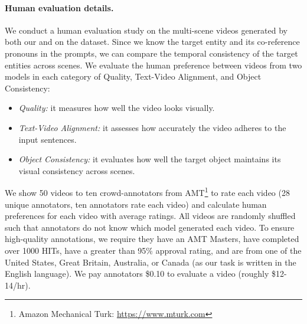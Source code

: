 \paragraph{Human evaluation details.}
We conduct a human evaluation study on the multi-scene videos generated by both our \method{} and \modelscope{} on the \corefdata{} dataset.
Since we know the target entity and its co-reference pronouns in the \corefdata{} prompts,
we can compare the temporal consistency of the target entities across scenes.
We evaluate the human preference between videos from two models in each category of Quality, Text-Video Alignment, and Object Consistency:
\begin{itemize}
    \item \textit{Quality:} it measures how well the video looks visually.
    \item \textit{Text-Video Alignment:} it assesses how accurately the video adheres to the input sentences.
    \item \textit{Object Consistency:} it evaluates how well the target object maintains its visual consistency across scenes.
\end{itemize}
We show 50 videos to ten crowd-annotators from AMT\footnote{Amazon Mechanical Turk: \url{https://www.mturk.com}} to rate each video (28 unique annotators, ten annotators rate each video) and calculate human preferences for each video with average ratings. All videos are randomly shuffled such that annotators do not know which model generated each video.
To ensure high-quality annotations, we require they have an AMT Masters, have completed over 1000 HITs, have a greater than 95\% approval rating, and are from one of the United States, Great Britain, Australia, or Canada (as our task is written in the English language). We pay annotators \$0.10 to evaluate a video (roughly \$12-14/hr).




